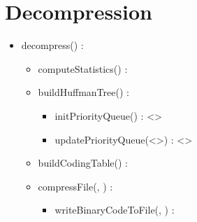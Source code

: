 \section{Decompression}


\begin{itemize}
    \item decompress(\binaryFile) : \binaryFile
    \begin{itemize}
        \item computeStatistics(\binaryFile) : \statistics
        \item buildHuffmanTree(\statistics) : \huffmanTree
        \begin{itemize}
            \item initPriorityQueue(\statistics) : \priorityQueue<\huffmanTree>
            \item updatePriorityQueue(\priorityQueue<\huffmanTree>) : \priorityQueue<\huffmanTree>
        \end{itemize}
        \item buildCodingTable(\huffmanTree) : \codingTable
        \item compressFile(\binaryFile, \codingTable) : \binaryFile
        \begin{itemize}
            \item writeBinaryCodeToFile(\binaryFile, \binaryCode) : \binaryFile
        \end{itemize}
    \end{itemize}
\end{itemize}